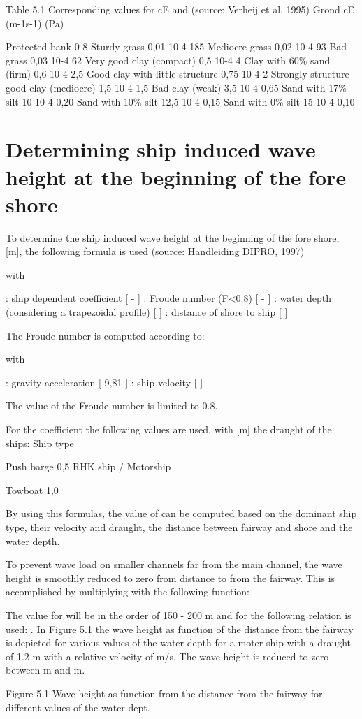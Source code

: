 Table 5.1 Corresponding values for cE and  (source: Verheij et al, 1995)
Grond	cE (m-1s-1)	  (Pa)

Protected bank	0	8
Sturdy grass	0,01 10-4	185
Mediocre grass	0,02 10-4	93
Bad grass	0,03 10-4	62
Very good clay (compact)	0,5 10-4	4
Clay with 60\% sand (firm)	0,6 10-4	2,5
Good clay with  little structure	0,75 10-4	2
Strongly structure good clay
(mediocre)	1,5 10-4	1,5
Bad clay (weak)	3,5 10-4	0,65
Sand with 17\% silt	10 10-4	0,20
Sand with 10\% silt	12,5 10-4	0,15
Sand with 0\% silt	15 10-4	0,10


\chapter{Determining ship induced wave height at the beginning of the fore shore}
To determine the ship induced wave height at the beginning of the fore shore,   [m], the following formula is used (source: Handleiding DIPRO, 1997)

	
with

 	: ship dependent coefficient [ - ]
 	: Froude number (F<0.8) [ - ]
 	: water depth (considering a  trapezoidal profile) [ ]
 	: distance of shore to ship [ ]

The Froude number is computed according to:
	
with

 	: gravity acceleration [ 9,81  ]
 	: ship velocity [ ]

The value of the Froude number is limited to 0.8.

For the coefficient   the following values are used, with   [m] the draught of the ships:
Ship type	

Push barge	0,5
RHK ship / Motorship	

Towboat	1,0

By using this formulas, the value of  can be computed based on the dominant ship type, their velocity and draught, the distance between fairway and shore and the water depth.

To prevent wave load on smaller channels far from the main channel, the wave height is smoothly reduced to zero  from distance   to   from the fairway.
This is accomplished by multiplying   with the following function:

	
	 	

The value for   will be in the order of 150 - 200 m and for  the following relation is used:   .
 In Figure 5.1 the wave height   as function of the distance from the fairway   is depicted for various values of the water depth    for a moter ship with a draught of 1.2 m with a relative velocity of  m/s.
The wave height is reduced to zero between  m and  m.

Figure 5.1 Wave height as function from the distance from the fairway for different values of the water dept.
